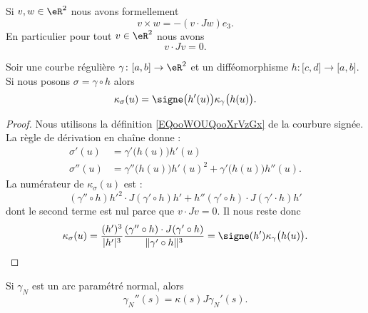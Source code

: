 Si \( v,w\in \eR^2\) nous avons formellement
\begin{equation}
    v\times w=-(v\cdot Jw)e_3.
\end{equation}
En particulier pour tout \( v\in \eR^2\) nous avons
\begin{equation}
    v\cdot Jv=0.
\end{equation}

\begin{lemma}
    Soir une courbe régulière \( \gamma\colon \mathopen[ a , b \mathclose]\to \eR^2\) et un difféomorphisme \( h\colon \mathopen[ c , d \mathclose]\to \mathopen[ a , b \mathclose]\). Si nous posons \( \sigma=\gamma\circ h\) alors
    \begin{equation}        \label{EQooSQNMooUKGhPd}
        \kappa_{\sigma}(u)=\signe\big( h'(u) \big)\kappa_{\gamma}\big( h(u) \big).
    \end{equation}
\end{lemma}

\begin{proof}
    Nous utilisons la définition \eqref{EQooWOUQooXrVzGx} de la courbure signée. La règle de dérivation en chaîne donne :
    \begin{subequations}
        \begin{align}
            \sigma'(u)&=\gamma'\big( h(u) \big)h'(u)\\
            \sigma''(u)&=\gamma''\big( h(u) \big)h'(u)^2+\gamma'\big( h(u) \big)h''(u).
        \end{align}
    \end{subequations}
    La numérateur de \( \kappa_{\sigma}(u)\) est :
    \begin{equation}
        (\gamma''\circ h)h'^2\cdot J(\gamma'\circ h)h'+h''(\gamma'\circ h)\cdot J(\gamma'\cdot h)h'
    \end{equation}
    dont le second terme est nul parce que \( v\cdot Jv=0\). Il nous reste donc
    \begin{equation}
        \kappa_{\sigma}(u)=\frac{ (h')^3 }{ | h' |^3} \frac{ (\gamma''\circ h)\cdot J(\gamma'\circ h) }{ \| \gamma'\circ h \|^3 }=\signe(h')\kappa_{\gamma}\big( h(u) \big).
    \end{equation}
\end{proof}

\begin{lemma}        \label{LEMooKPORooEGJCRm}
    Si \( \gamma_N\) est un arc paramétré normal, alors 
    \begin{equation}
        \gamma_N''(s)=\kappa(s)J\gamma_N'(s).
    \end{equation}
\end{lemma}


